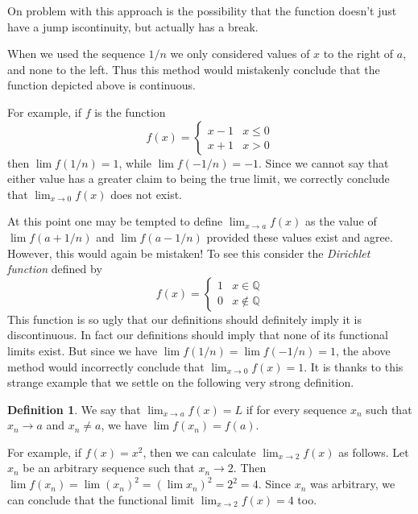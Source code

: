 \documentclass[11pt,oneside]{amsbook}
\newcommand{\QQ}{\mathbb Q}
\theoremstyle{definition}
\theoremstyle{plain}
\theoremstyle{definition}
\newtheorem{defn}[thm]{Definition}
\theoremstyle{remark}
\numberwithin{equation}{section}
\numberwithin{figure}{section}
\begin{document}
On problem with this approach is the possibility that the function doesn't just have a jump iscontinuity, but actually has a break.
\begin{center}
\end{center}
When we used the sequence $1/n$ we only considered values of $x$ to the right of $a$, and none to the left. Thus this method would mistakenly conclude that the function depicted above is continuous.

For example, if $f$ is the function
\[f(x)=\begin{cases}x-1&x\leq0\\x+1&x>0\end{cases}
\]
then $\lim f(1/n)=1$, while $\lim f(-1/n)=-1$. Since we cannot say that either value has a greater claim to being the true limit, we correctly conclude that $\lim_{x\to0}f(x)$ does not exist.

At this point one may be tempted to define $\lim_{x\to a}f(x)$ as the value of $\lim f(a+1/n)$ and $\lim f(a-1/n)$ provided these values exist and agree. However, this would again be mistaken! To see this consider the \emph{Dirichlet function} defined by
\[f(x)=\begin{cases}1&x\in\QQ\\0&x\notin\QQ\end{cases}
\]
This function is so ugly that our definitions should definitely imply it is discontinuous. In fact our definitions should imply that none of its functional limits exist. But since we have $\lim f(1/n)=\lim f(-1/n)=1$, the above method would incorrectly conclude that $\lim_{x\to0}f(x)=1$. It is thanks to this strange example that we settle on the following very strong definition.

\begin{defn}
  We say that $\lim_{x\to a}f(x)=L$ if for every sequence $x_n$ such that $x_n\to a$ and $x_n\neq a$, we have $\lim f(x_n)=f(a)$.
\end{defn}

For example, if $f(x)=x^2$, then we can calculate $\lim_{x\to2}f(x)$ as follows. Let $x_n$ be an arbitrary sequence such that $x_n\to2$. Then $\lim f(x_n)=\lim(x_n)^2=(\lim x_n)^2=2^2=4$. Since $x_n$ was arbitrary, we can conclude that the functional limit $\lim_{x\to2}f(x)=4$ too.
\end{document}
